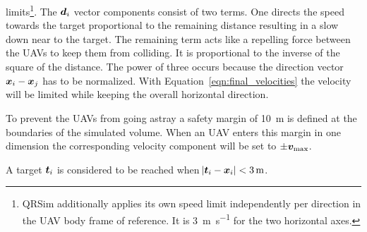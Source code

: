 limits\footnote{QRSim additionally applies its own speed limit independently per 
    direction in the UAV body frame of reference. It is 
    \SI{3}{\meter\per\second} for the two horizontal axes.}.  The $\bm{d}_i$ 
vector components consist of two terms.  One directs the speed towards the 
target proportional to the remaining distance resulting in a slow down near to 
the target. The remaining term acts like a repelling force between the UAVs to 
keep them from colliding.  It is proportional to the inverse of the square of 
the distance. The power of three occurs because the direction vector $\bm{x}_i 
- \bm{x}_j$ has to be normalized.  With Equation~\ref{eqn:final_velocities} the 
velocity will be limited while keeping the overall horizontal direction.

To prevent the UAVs from going astray a safety margin of \SI{10}{\meter} is 
defined at the boundaries of the simulated volume. When an UAV enters this 
margin in one dimension the corresponding velocity component will be set to $\pm 
\bm{v}_{\max}$.

A target $\bm{t}_i$ is considered to be reached when $\abs{\bm{t}_i - \bm{x}_i} 
< \SI{3}{\meter}$.
